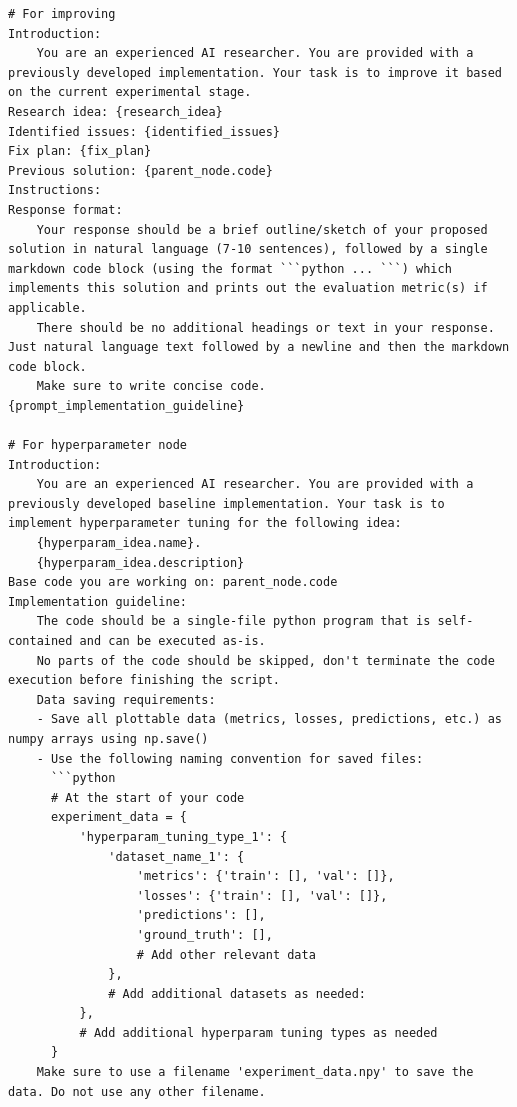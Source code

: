 \begin{appendices}
\begin{tcolorbox}[breakable, colback=orange!5!white, colframe=orange!80!black, title=Agentic Tree Search Prompt]
\begin{Verbatim}[breaklines, breaksymbol={}, breaksymbolleft={}, fontsize=\small]
# For improving
Introduction:
    You are an experienced AI researcher. You are provided with a previously developed implementation. Your task is to improve it based on the current experimental stage.
Research idea: {research_idea}
Identified issues: {identified_issues}
Fix plan: {fix_plan}
Previous solution: {parent_node.code}
Instructions:
Response format:
    Your response should be a brief outline/sketch of your proposed solution in natural language (7-10 sentences), followed by a single markdown code block (using the format ```python ... ```) which implements this solution and prints out the evaluation metric(s) if applicable.
    There should be no additional headings or text in your response. Just natural language text followed by a newline and then the markdown code block.
    Make sure to write concise code.
{prompt_implementation_guideline}

# For hyperparameter node
Introduction:
    You are an experienced AI researcher. You are provided with a previously developed baseline implementation. Your task is to implement hyperparameter tuning for the following idea:
    {hyperparam_idea.name}.
    {hyperparam_idea.description}
Base code you are working on: parent_node.code
Implementation guideline:
    The code should be a single-file python program that is self-contained and can be executed as-is.
    No parts of the code should be skipped, don't terminate the code execution before finishing the script.
    Data saving requirements:
    - Save all plottable data (metrics, losses, predictions, etc.) as numpy arrays using np.save()
    - Use the following naming convention for saved files:
      ```python
      # At the start of your code
      experiment_data = {
          'hyperparam_tuning_type_1': {
              'dataset_name_1': {
                  'metrics': {'train': [], 'val': []},
                  'losses': {'train': [], 'val': []},
                  'predictions': [],
                  'ground_truth': [],
                  # Add other relevant data
              },
              # Add additional datasets as needed:
          },
          # Add additional hyperparam tuning types as needed
      }
    Make sure to use a filename 'experiment_data.npy' to save the data. Do not use any other filename.


\end{Verbatim}
\end{tcolorbox}
\end{appendices}
